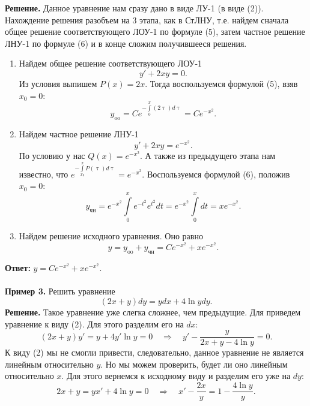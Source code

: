 \documentclass[a4paper, 12pt]{article}
\renewcommand{\tau}{\uptau}
\begin{document}
\textbf{Решение.} Данное уравнение нам сразу дано в виде ЛУ-1 (в виде (2)). Нахождение решения разобъем на 3 этапа, как в СтЛНУ, т.е. найдем сначала общее решение соответствующего ЛОУ-1 по формуле (5), затем частное решение ЛНУ-1 по формуле (6) и в конце сложим получившееся решения.\begin{enumerate}
	\item Найдем общее решение соответствующего ЛОУ-1 $$y' + 2xy = 0.$$ Из условия выпишем $P(x) = 2x$. Тогда воспользуемся формулой (5), взяв $x_0 = 0$:
	$$y_\text{oo} = Ce^{-\int\limits_{0}^x(2\tau)d\tau} = Ce^{-x^2}.$$
	\item Найдем частное решение ЛНУ-1 $$y' + 2xy = e^{-x^2}.$$ По условию у нас $Q(x) = e^{-x^2}$. А также из предыдущего этапа нам известно, что $e^{-\int\limits_{x_0}^xP(\tau)d\tau} = e^{-x^2}$. Воспользуемся формулой (6), положив $x_0 = 0$:
	$$y_\text{чн} = e^{-x^2}\int\limits_0^xe^{-t^2}e^{t^2}dt = e^{-x^2}\int\limits_0^xdt = xe^{-x^2}.$$
	\item Найдем решение исходного уравнения. Оно равно
	$$y = y_\text{oo} + y_\text{чн} = Ce^{-x^2} + xe^{-x^2}.$$
\end{enumerate}
\textbf{Ответ:} $y = Ce^{-x^2} + xe^{-x^2}$.\\\\
\textbf{Пример 3.} Решить уравнение $$(2x+y)dy = ydx + 4\ln y dy.$$
\textbf{Решение.} Такое уравнение уже слегка сложнее, чем предыдущие. Для приведем уравнение к виду (2). Для этого разделим его на $dx$:
$$(2x + y)y' = y + 4y'\ln y = 0\quad \Rightarrow\quad y' - \dfrac{y}{2x + y - 4\ln y} = 0.$$
К виду (2) мы не смогли привести, следовательно, данное уравнение не является линейным относительно $y$. Но мы можем проверить, будет ли оно линейным относительно $x$. Для этого вернемся к исходному виду и разделим его уже на $dy$:
$$2x + y = yx' + 4\ln y = 0\quad \Rightarrow \quad x' - \dfrac{2x}{y} = 1 - \dfrac{4\ln y}{y}.$$
\end{document}
